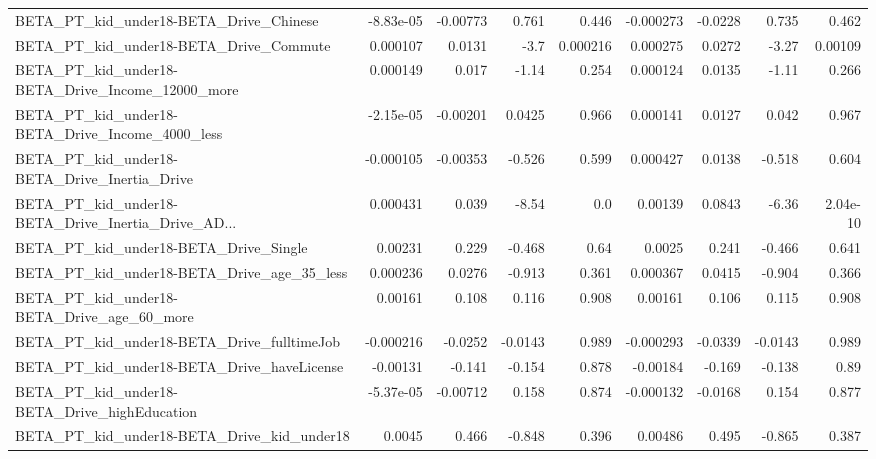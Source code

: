 \begin{tabular}{lrrrrrrrr}
BETA\_PT\_kid\_under18-BETA\_Drive\_Chinese             &   -8.83e-05 &     -0.00773 &    0.761 &    0.446 &  -0.000273 &     -0.0228 &        0.735 &         0.462 \\
BETA\_PT\_kid\_under18-BETA\_Drive\_Commute             &    0.000107 &       0.0131 &     -3.7 & 0.000216 &   0.000275 &      0.0272 &        -3.27 &       0.00109 \\
BETA\_PT\_kid\_under18-BETA\_Drive\_Income\_12000\_more   &    0.000149 &        0.017 &    -1.14 &    0.254 &   0.000124 &      0.0135 &        -1.11 &         0.266 \\
BETA\_PT\_kid\_under18-BETA\_Drive\_Income\_4000\_less    &   -2.15e-05 &     -0.00201 &   0.0425 &    0.966 &   0.000141 &      0.0127 &        0.042 &         0.967 \\
BETA\_PT\_kid\_under18-BETA\_Drive\_Inertia\_Drive       &   -0.000105 &     -0.00353 &   -0.526 &    0.599 &   0.000427 &      0.0138 &       -0.518 &         0.604 \\
BETA\_PT\_kid\_under18-BETA\_Drive\_Inertia\_Drive\_AD... &    0.000431 &        0.039 &    -8.54 &      0.0 &    0.00139 &      0.0843 &        -6.36 &      2.04e-10 \\
BETA\_PT\_kid\_under18-BETA\_Drive\_Single              &     0.00231 &        0.229 &   -0.468 &     0.64 &     0.0025 &       0.241 &       -0.466 &         0.641 \\
BETA\_PT\_kid\_under18-BETA\_Drive\_age\_35\_less         &    0.000236 &       0.0276 &   -0.913 &    0.361 &   0.000367 &      0.0415 &       -0.904 &         0.366 \\
BETA\_PT\_kid\_under18-BETA\_Drive\_age\_60\_more         &     0.00161 &        0.108 &    0.116 &    0.908 &    0.00161 &       0.106 &        0.115 &         0.908 \\
BETA\_PT\_kid\_under18-BETA\_Drive\_fulltimeJob         &   -0.000216 &      -0.0252 &  -0.0143 &    0.989 &  -0.000293 &     -0.0339 &      -0.0143 &         0.989 \\
BETA\_PT\_kid\_under18-BETA\_Drive\_haveLicense         &    -0.00131 &       -0.141 &   -0.154 &    0.878 &   -0.00184 &      -0.169 &       -0.138 &          0.89 \\
BETA\_PT\_kid\_under18-BETA\_Drive\_highEducation       &   -5.37e-05 &     -0.00712 &    0.158 &    0.874 &  -0.000132 &     -0.0168 &        0.154 &         0.877 \\
BETA\_PT\_kid\_under18-BETA\_Drive\_kid\_under18         &      0.0045 &        0.466 &   -0.848 &    0.396 &    0.00486 &       0.495 &       -0.865 &         0.387 \\

\end{tabular}
